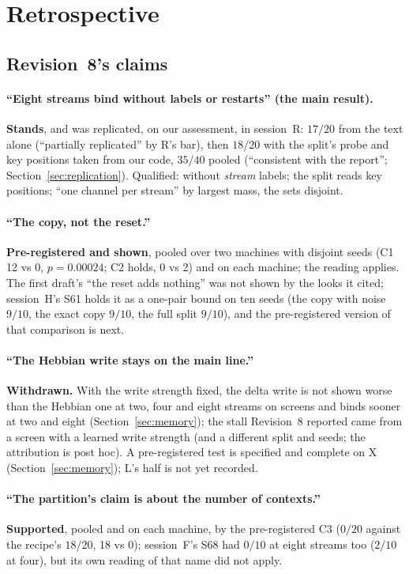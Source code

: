 \documentclass[11pt]{article}
\begin{document}
\section{Retrospective}
\label{sec:retro}

\subsection{Revision~8's claims}

\paragraph{``Eight streams bind without labels or restarts'' (the main result).} \textbf{Stands}, and was replicated, on our assessment, in session~R: $17/20$ from the text alone (``partially replicated'' by R's bar), then $18/20$ with the split's probe and key positions taken from our code, $35/40$ pooled (``consistent with the report''; Section~\ref{sec:replication}). Qualified: without \emph{stream} labels; the split reads key positions; ``one channel per stream'' by largest mass, the sets disjoint.

\paragraph{``The copy, not the reset.''} \textbf{Pre-registered and shown}, pooled over two machines with disjoint seeds (C1 12 vs 0, $p = 0.00024$; C2 holds, 0 vs 2) and on each machine; the reading applies. The first draft's ``the reset adds nothing'' was not shown by the looks it cited; session~H's S61 holds it as a one-pair bound on ten seeds (the copy with noise $9/10$, the exact copy $9/10$, the full split $9/10$), and the pre-registered version of that comparison is next.

\paragraph{``The Hebbian write stays on the main line.''} \textbf{Withdrawn.} With the write strength fixed, the delta write is not shown worse than the Hebbian one at two, four and eight streams on screens and binds sooner at two and eight (Section~\ref{sec:memory}); the stall Revision~8 reported came from a screen with a learned write strength (and a different split and seeds; the attribution is post hoc). A pre-registered test is specified and complete on X (Section~\ref{sec:memory}); L's half is not yet recorded.

\paragraph{``The partition's claim is about the number of contexts.''} \textbf{Supported}, pooled and on each machine, by the pre-registered C3 ($0/20$ against the recipe's $18/20$, 18 vs 0); session~F's S68 had $0/10$ at eight streams too ($2/10$ at four), but its own reading of that name did not apply.
\end{document}
